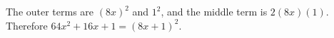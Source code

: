 The outer terms are $(8x)^2$ and $1^2$, and the middle term is $2(8x)(1)$. Therefore $\boxed{64x^2+16x+1=(8x+1)^2}$.
